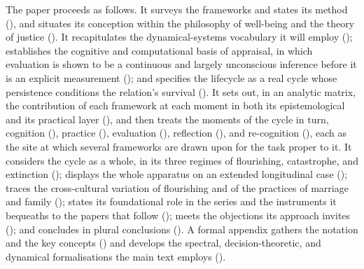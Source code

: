 The paper proceeds as follows. It surveys the frameworks and states its method (), and situates its conception within the philosophy of well-being and the theory of justice (). It recapitulates the dynamical-systems vocabulary it will employ (); establishes the cognitive and computational basis of appraisal, in which evaluation is shown to be a continuous and largely unconscious inference before it is an explicit measurement (); and specifies the lifecycle as a real cycle whose persistence conditions the relation's survival (). It sets out, in an analytic matrix, the contribution of each framework at each moment in both its epistemological and its practical layer (), and then treats the moments of the cycle in turn, cognition (), practice (), evaluation (), reflection (), and re-cognition (), each as the site at which several frameworks are drawn upon for the task proper to it. It considers the cycle as a whole, in its three regimes of flourishing, catastrophe, and extinction (); displays the whole apparatus on an extended longitudinal case (); traces the cross-cultural variation of flourishing and of the practices of marriage and family (); states its foundational role in the series and the instruments it bequeaths to the papers that follow (); meets the objections its approach invites (); and concludes in plural conclusions (). A formal appendix gathers the notation and the key concepts () and develops the spectral, decision-theoretic, and dynamical formalisations the main text employs ().

